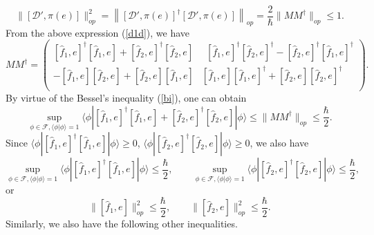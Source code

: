 \documentclass[a4paper,12pt]{article}
\begin{document}
\begin{equation}
	\big\|[\mathcal{D}',\pi(e)]\big\|_{op}^2
	=\left\|[\mathcal{D}',\pi(e)]^\dag[\mathcal{D}',\pi(e)]\right\|_{op}
	=\frac{2}{\hbar}\|M M^\dag\|_{op}\leqslant 1.
\end{equation}
From the above expression (\ref{d1d}), we have
\begin{equation}\label{dd2}
	M M^\dag
	=\left(
	\begin{array}{cc}
		[\hat{f}_1,e]^\dag[\hat{f}_1,e]+[\hat{f}_2,e]^\dag[\hat{f}_2,e] & ~~[\hat{f}_1,e]^\dag[\hat{f}_2,e]^\dag-[\hat{f}_2,e]^\dag[\hat{f}_1,e]^\dag \\[0.3em]
		-[\hat{f}_1,e][\hat{f}_2,e]+[\hat{f}_2,e][\hat{f}_1,e] & [\hat{f}_1,e][\hat{f}_1,e]^\dag+[\hat{f}_2,e][\hat{f}_2,e]^\dag \\
	\end{array}\right).
\end{equation}
By virtue of the Bessel's inequality (\ref{bi}), one can obtain
\begin{equation}
	\sup_{\phi\in\mathcal{F},\langle\phi|\phi\rangle=1}
	\!\!\!\!\!\!\langle\phi|[\hat{f}_1,e]^\dag[\hat{f}_1,e]+[\hat{f}_2,e]^\dag[\hat{f}_2,e]|\phi\rangle
	\leqslant\|M M^\dag\|_{op} \leqslant\frac{\hbar}{2}.
\end{equation}
Since $\langle\phi|[\hat{f}_1,e]^\dag[\hat{f}_1,e]|\phi\rangle \geqslant 0$, $\langle\phi|[\hat{f}_2,e]^\dag[\hat{f}_2,e]|\phi\rangle \geqslant 0$, we also have
\begin{equation}
	\sup_{\phi\in\mathcal{F},\langle\phi|\phi\rangle=1}
	\!\!\!\!\!\!\langle\phi|[\hat{f}_1,e]^\dag[\hat{f}_1,e]|\phi\rangle
	\leqslant \frac{\hbar}{2},\qquad
	\sup_{\phi\in\mathcal{F},\langle\phi|\phi\rangle=1}
	\!\!\!\!\!\!\langle\phi|[\hat{f}_2,e]^\dag[\hat{f}_2,e]|\phi\rangle
	\leqslant \frac{\hbar}{2},
\end{equation}
or
\begin{equation}
	\big\|[\hat{f}_1,e]\big\|_{op}^2\leqslant \frac{\hbar}{2},\qquad
	\big\|[\hat{f}_2,e]\big\|_{op}^2\leqslant \frac{\hbar}{2}.
\end{equation}
Similarly, we also have the following other inequalities.
\end{document}
